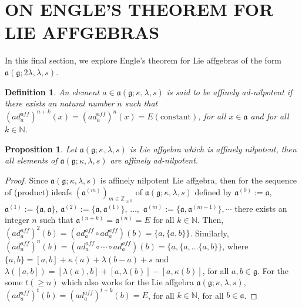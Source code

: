 \documentclass{article}
\newtheorem{definition}{Definition}[section]
\newtheorem{proposition}[theorem]{Proposition}
\theoremstyle{definition}
\theoremstyle{remark}
\theoremstyle{plain}
\begin{document}
\section{ON ENGLE'S THEOREM FOR LIE AFFGEBRAS}
In this final section, we explore Engle's theorem for Lie affgebras of the form $\mathfrak{a}(\mathfrak{g}; 2\lambda,\lambda,s)$. 
\begin{definition}
    An element $a\in \mathfrak{a}(\mathfrak{g};\kappa, \lambda,s)$ is said to be affinely ad-nilpotent if there exists an natural number $n$ such that $(ad^{aff}_{a})^{n+k}(x)=(ad^{aff}_{a})^{n}(x)=E(\text{constant})$, for all $x\in \mathfrak{a}$ and for all $ k\in \mathbb{N}$. %
\end{definition}
\begin{proposition}
Let $\mathfrak{a}(\mathfrak{g}; \kappa, \lambda, s)$ is Lie affgebra which is affinely nilpotent, then all elements of $\mathfrak{a}(\mathfrak{g}; \kappa, \lambda, s)$ are affinely ad-nilpotent.
\end{proposition}

\begin{proof}
   
Since $\mathfrak{a}(\mathfrak{g}; \kappa, \lambda, s)$ is affinely nilpotent Lie affgebra, then for the sequence of (product) ideafs $(\mathfrak{a}^{(m)})_{m \in \mathbb{Z}_{\geq 0}}$ of $\mathfrak{a}(\mathfrak{g}; \kappa, \lambda, s)$  defined by $\mathfrak{a}^{(0)}:=\mathfrak{a}$, $\mathfrak{a}^{(1)}:=\{\mathfrak{a}, \mathfrak{a}\}$, $\mathfrak{a}^{(2)}:=\{\mathfrak{a},\mathfrak{a}^{(1)}\}$, $\ldots,$ $\mathfrak{a}^{(m)}:=\{\mathfrak{a}, \mathfrak{a}^{(m-1)}\},\cdots$ there exists an integer $n$ such that $\mathfrak{a}^{(n+k)}=\mathfrak{a}^{(n)}=E$ for all $k\in \mathbb{N}$. 
Then, $(ad^{aff}_{a})^{2}(b)=(ad^{aff}_{a}\circ ad^{aff}_{a})(b)=\{a, \{a, b\}\}$. Similarly, $(ad^{aff}_{a})^{n}(b)=(ad^{aff}_{a}\circ \cdots \circ ad^{aff}_{a})(b)=\{a, \{a, \ldots \{a, b\}\}$, where $\{a, b\}=[a, b]+\kappa(a)+\lambda(b-a)+s$ and $\lambda([a, b])=[\lambda(a), b]+[a, \lambda(b)]-[a, \kappa(b)]$, for all $a, b \in \mathfrak{g}.$ For the some $t(\geq n)$ which also works for the Lie affgebra $\mathfrak{a}(\mathfrak{g}; \kappa, \lambda, s)$, $(ad^{aff}_{a})^{t}(b)=(ad^{aff}_{a})^{t+k}(b)=E$, for all $k\in \mathbb{N}$, for all $b \in \mathfrak{a}$. %
\end{proof}
\end{document}
